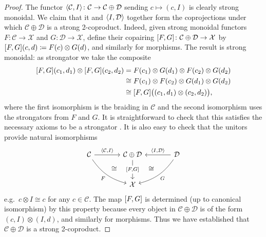 \documentclass[11pt, oneside, article]{memoir}
\theoremstyle{plain}
\theoremstyle{definition}
\theoremstyle{remark}
\newcommand{\cat}[1]{\mathcal{#1}}%
\DeclarePairedDelimiter{\pair}{\langle}{\rangle}
\DeclarePairedDelimiter{\copair}{[}{]}
\newcommand{\hide}[2][]{#1}
\begin{document}
\begin{proof}
The functor $\pair{\cat{C},I}\colon\cat{C}\to\cat{C}\oplus\cat{D}$ sending $c\mapsto (c,I)$ is clearly strong monoidal. We claim that it and $\pair{I,\cat{D}}$ together form the coprojections under which $\cat{C}\oplus\cat{D}$ is a strong 2-coproduct. Indeed, given strong monoidal functors $F\colon\cat{C}\to\cat{X}$ and $G\colon\cat{D}\to\cat{X}$, define their copairing $\copair{F,G}\colon\cat{C}\oplus\cat{D}\to\cat{X}$ by $\copair{F,G}(c,d)\coloneqq F(c)\otimes G(d)$, and similarly for morphisms. The result is strong monoidal: as strongator we take the composite
\begin{align*}
	\copair{F,G}(c_1,d_1)\otimes\copair{F,G}(c_2,d_2)&=
	F(c_1)\otimes G(d_1)\otimes F(c_2)\otimes G(d_2)\\&\cong
	F(c_1)\otimes F(c_2)\otimes G(d_1)\otimes G(d_2)\\&\cong
	\copair{F,G}\big((c_1,d_1)\otimes(c_2,d_2)\big),
\end{align*}
where the first isomorphism is the braiding in $\cat{C}$ and the second isomorphism uses the strongators from $F$ and $G$. It is straightforward to check that this satisfies the necessary axioms to be a strongator%
\hide[.]{
, e.g.\ the commutativity of the following diagram
\[
\begin{tikzcd}
	Fc_1\otimes Gd_1\otimes Fc_2\otimes Gd_2\otimes Fc_3\otimes Gd_3\ar[r, "\sigma"]\ar[d, "\sigma"']&
	Fc_1\otimes Gd_1\otimes Fc_2\otimes Fc_3\otimes Gd_2\otimes Gd_3\ar[d]\\
	Fc_1\otimes Fc_2\otimes Gc_1\otimes Gc_2\otimes Fc_3\otimes Gd_3\ar[d]&
	Fc_1\otimes Gd_1\otimes F(c_2\otimes c_3)\otimes G(d_2\otimes d_3)\ar[d, "\sigma"]\\
	F(c_1\otimes c_2)\otimes G(d_1\otimes d_2)\otimes Fc_3\otimes Gd_3\ar[d, "\sigma"']&
	Fc_1\otimes F(c_2\otimes c_3)\otimes Gd_1\otimes G(d_2\otimes d_3)\ar[d]\\
	F(c_1\otimes c_2)\otimes Fc_3\otimes G(d_1\otimes d_2)\otimes Gd_3\ar[r]&
	F(c_1\otimes c_2\otimes c_3)\otimes G(d_1\otimes d_2\otimes d_3)	
\end{tikzcd}
\]
}
It is also easy to check that the unitors provide natural isomorphisms
\begin{equation}\label{eqn.coproduct_smc}
\begin{tikzcd}[sep=large]
	\cat{C}\ar[r, "\pair{\cat{C},I}"]\ar[dr, bend right=20pt, "F"', "" name=F]&
	|[alias=CD]|\cat{C}\oplus\cat{D}\ar[d, "\copair{F,G}" description]&
	\cat{D}\ar[l, "\pair{I,\cat{D}}"']\ar[dl, bend left=20pt, "G", ""' name=G]\\&
	\cat{X}
	\ar[from=G, to=CD, phantom, near start, "\cong"]
	\ar[from=F, to=CD, phantom, near start, "\cong"]
\end{tikzcd}
\end{equation}
e.g.\ $c\otimes I\cong c$ for any $c\in\cat{C}$. The map $\copair{F,G}$ is determined (up to canonical isomorphism) by this property because every object in $\cat{C}\oplus\cat{D}$ is of the form $(c,I)\otimes(I,d)$, and similarly for morphisms. Thus we have established that $\cat{C}\oplus\cat{D}$ is a strong 2-coproduct.


\end{proof}
\end{document}
